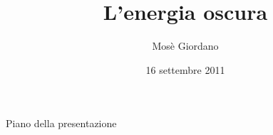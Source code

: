 \documentclass{beamer}
\title{L'energia oscura}
\author{Mosè Giordano}
\date{16 settembre 2011}
\institute[UniSalento]{Università del Salento}
\begin{document}
\begin{frame}
  \maketitle
\end{frame}

\begin{frame}{Piano della presentazione}
  \tableofcontents
\end{frame}
\end{document}
